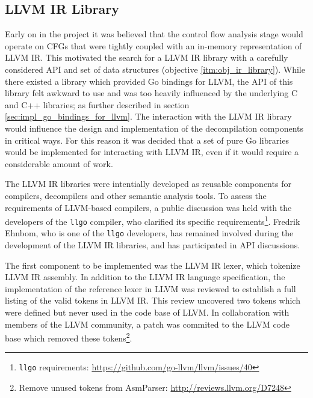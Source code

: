 
\subsection{LLVM IR Library}
\label{sec:impl_llvm_ir_library}

Early on in the project it was believed that the control flow analysis stage would operate on CFGs that were tightly coupled with an in-memory representation of LLVM IR. This motivated the search for a LLVM IR library with a carefully considered API and set of data structures (objective \ref{itm:obj_ir_library}). While there existed a library which provided Go bindings for LLVM, the API of this library felt awkward to use and was too heavily influenced by the underlying C and C++ libraries; as further described in section \ref{sec:impl_go_bindings_for_llvm}. The interaction with the LLVM IR library would influence the design and implementation of the decompilation components in critical ways. For this reason it was decided that a set of pure Go libraries would be implemented for interacting with LLVM IR, even if it would require a considerable amount of work.


The LLVM IR libraries were intentially developed as reusable components for compilers, decompilers and other semantic analysis tools. To assess the requirements of LLVM-based compilers, a public discussion was held with the developers of the \texttt{llgo} compiler, who clarified its specific requirements\footnote{\texttt{llgo} requirements: \url{https://github.com/go-llvm/llvm/issues/40}}. Fredrik Ehnbom, who is one of the \texttt{llgo} developers, has remained involved during the development of the LLVM IR libraries, and has participated in API discussions.

The first component to be implemented was the LLVM IR lexer, which tokenize LLVM IR assembly. In addition to the LLVM IR language specification, the implementation of the reference lexer in LLVM was reviewed to establish a full listing of the valid tokens in LLVM IR. This review uncovered two tokens which were defined but never used in the code base of LLVM. In collaboration with members of the LLVM community, a patch was commited to the LLVM code base which removed these tokens\footnote{Remove unused tokens from AsmParser: \url{http://reviews.llvm.org/D7248}}.

